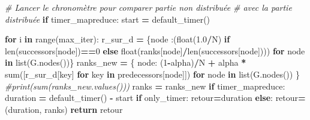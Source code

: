 \documentclass[10pt,a4paper]{article}
\newenvironment{Shaded}{\begin{snugshade}}{\end{snugshade}}
\newcommand{\BuiltInTok}[1]{#1}
\newcommand{\CommentTok}[1]{\textcolor[rgb]{0.56,0.35,0.01}{\textit{#1}}}
\newcommand{\ControlFlowTok}[1]{\textcolor[rgb]{0.13,0.29,0.53}{\textbf{#1}}}
\newcommand{\DecValTok}[1]{\textcolor[rgb]{0.00,0.00,0.81}{#1}}
\newcommand{\FloatTok}[1]{\textcolor[rgb]{0.00,0.00,0.81}{#1}}
\newcommand{\KeywordTok}[1]{\textcolor[rgb]{0.13,0.29,0.53}{\textbf{#1}}}
\newcommand{\NormalTok}[1]{#1}
\newcommand{\OperatorTok}[1]{\textcolor[rgb]{0.81,0.36,0.00}{\textbf{#1}}}
\theoremstyle{break}
\begin{document}
\begin{Shaded}
\begin{Highlighting}[]
    \CommentTok{# Lancer le chronomètre pour comparer partie non distribuée }
    \CommentTok{# avec la partie distribuée}
    \ControlFlowTok{if}\NormalTok{ timer_mapreduce:}
\NormalTok{            start }\OperatorTok{=}\NormalTok{ default_timer()}
    
    \ControlFlowTok{for}\NormalTok{ i }\KeywordTok{in} \BuiltInTok{range}\NormalTok{(max_iter):}
\NormalTok{        r_sur_d }\OperatorTok{=}\NormalTok{ \{node :(}\BuiltInTok{float}\NormalTok{(}\FloatTok{1.0}\OperatorTok{/}\NormalTok{N) }\ControlFlowTok{if} \BuiltInTok{len}\NormalTok{(successors[node])}\OperatorTok{==}\DecValTok{0}
          \ControlFlowTok{else} \BuiltInTok{float}\NormalTok{(ranks[node]}\OperatorTok{/}\BuiltInTok{len}\NormalTok{(successors[node]))) }\ControlFlowTok{for}\NormalTok{ node }\KeywordTok{in} \BuiltInTok{list}\NormalTok{(G.nodes())\}}
\NormalTok{        ranks_new }\OperatorTok{=}\NormalTok{ \{}
\NormalTok{            node: (}\DecValTok{1}\OperatorTok{-}\NormalTok{alpha)}\OperatorTok{/}\NormalTok{N }\OperatorTok{+}
\NormalTok{            alpha }\OperatorTok{*} \BuiltInTok{sum}\NormalTok{([r_sur_d[key] }\ControlFlowTok{for}\NormalTok{ key }\KeywordTok{in}\NormalTok{ predecessors[node]])}
            \ControlFlowTok{for}\NormalTok{ node }\KeywordTok{in} \BuiltInTok{list}\NormalTok{(G.nodes())}
\NormalTok{        \}}
        \CommentTok{#print(sum(ranks_new.values()))}
\NormalTok{        ranks }\OperatorTok{=}\NormalTok{ ranks_new}
    \ControlFlowTok{if}\NormalTok{ timer_mapreduce:}
\NormalTok{            duration }\OperatorTok{=}\NormalTok{ default_timer() }\OperatorTok{-}\NormalTok{ start}
    \ControlFlowTok{if}\NormalTok{ only_timer:}
\NormalTok{        retour}\OperatorTok{=}\NormalTok{duration}
    \ControlFlowTok{else}\NormalTok{:}
\NormalTok{        retour}\OperatorTok{=}\NormalTok{(duration, ranks)}
    \ControlFlowTok{return}\NormalTok{ retour}
\end{Highlighting}
\end{Shaded}
\end{document}
